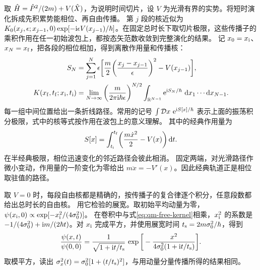 取 $\hat{H} = \hat{P}^2/(2m) + V(\hat{X})$，为说明时间切片，设 $V$ 为光滑有界的实势。将短时演化拆成先积累势能相位、再自由传播。
第 $j$ 段的核近似为 $K_0(x_j,\epsilon;x_{j-1},0)\exp[-\mathrm{i}\epsilon V(x_{j-1})/\hbar]$。在固定总时长下取切片极限，这些传播子的乘积作用在任一初始波包上，都按态矢范数收敛到完整演化的结果。
记 $x_0 = x_\mathrm i$、$x_N = x_\mathrm f$，把各段的相位相加，得到离散作用量和传播核\cite{mitpath}：
\begin{align}
    S_N &= \sum_{j=1}^{N}\epsilon\bigg[
       \frac{m}{2}\bigg(\frac{x_j - x_{j-1}}{\epsilon}\bigg)^2 - V(x_{j-1})\bigg],\\
    K(x_\mathrm f,t_\mathrm f;x_\mathrm i,t_\mathrm i) &= \lim_{N\to\infty}
      \bigg(\frac{m}{2\pi\mathrm{i}\hbar\epsilon}\bigg)^{N/2}
      \int_{\mathbb{R}^{N-1}}\mathop{}\!\mathrm{e}^{\mathrm{i} S_N/\hbar}\,\mathop{}\!\mathrm{d} x_1\cdots\mathop{}\!\mathrm{d} x_{N-1}.
\end{align}
每一组中间位置给出一条折线路径。常用的记号 $\textstyle \int\mathcal D x\,\mathop{}\!\mathrm{e}^{\mathrm{i} S[x]/\hbar}$ 表示上面的振荡积分极限，式中的核等式按作用在波包上的意义理解。
其中的经典作用量为
\begin{equation}\label{eq:qm-classical-action}
    S[x] = \int_{t_\mathrm i}^{t_\mathrm f}\biggl(\frac{m\dot x^2}{2} - V(x)\biggr)\mathop{}\!\mathrm{d} t.
\end{equation}
在半经典极限，相位迅速变化的邻近路径会彼此相消。
固定两端，对光滑路径作微小变动，作用量的一阶变化为零给出 $m\ddot x = -V'(x)$。因此经典轨道正是相位取驻值的路径。

取 $V = 0$ 时，每段自由核都是精确的，按传播子的复合律逐个积分，任意段数都给出总时长的自由核。
用它检验的展宽。取初始平均动量为零，$\psi(x_\mathrm i,0) \propto \exp[-x_\mathrm i^2/(4\sigma_0^2)]$。
在卷积中与式\eqref{eq:qm-free-kernel}相乘，$x_\mathrm i^2$ 的系数是 $-1/(4\sigma_0^2) + \mathrm{i} m/(2\hbar t)$。对 $x_\mathrm i$ 完成平方，并使用展宽时间 $t_{\mathrm{s}} = 2m\sigma_0^2/\hbar$，得到
\[
    \frac{\psi(x,t)}{\psi(0,0)} = \frac{1}{\sqrt{1 + \mathrm{i} t/t_{\mathrm{s}}}}\,
       \exp\bigg[-\frac{x^2}{4\sigma_0^2(1 + \mathrm{i} t/t_{\mathrm{s}})}\bigg].
\]
取模平方，读出 $\sigma_x^2(t) = \sigma_0^2[1 + (t/t_{\mathrm{s}})^2]$，与用动量分量传播所得的结果相同。


